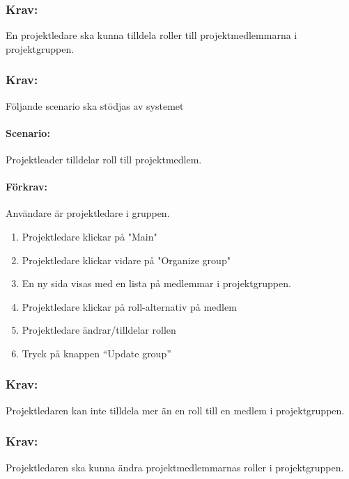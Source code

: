 \documentclass[paper=a4, fontsize=11pt,twoside]{article}
\begin{document}
\subsubsection{Krav:} En projektledare ska kunna tilldela roller till projektmedlemmarna i projektgruppen.

\paragraph{}
\subsubsection{Krav:}
Följande scenario ska stödjas av systemet
\paragraph{Scenario:}
Projektleader tilldelar roll till projektmedlem.
\paragraph{Förkrav:}
Användare är projektledare i gruppen.
\begin{enumerate} 
\item Projektledare klickar på "Main"
\item Projektledare klickar vidare på "Organize group"
\item En ny sida visas med en lista på medlemmar i projektgruppen.
\item Projektledare klickar på roll-alternativ på medlem
\item Projektledare ändrar/tilldelar rollen
\item Tryck på knappen “Update group”
\end{enumerate}

\paragraph{}
\subsubsection{Krav:}
	Projektledaren kan inte tilldela mer än en roll till en medlem i projektgruppen.

\paragraph{}
\subsubsection{Krav:}
	Projektledaren ska kunna ändra projektmedlemmarnas roller i projektgruppen.
\end{document}

